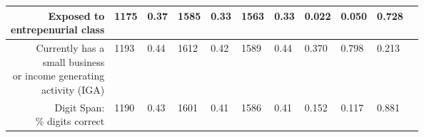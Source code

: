 \begin{longtable}{|r|l|l|l|l|l|l|l|l|l|l}
	 \makecell{Exposed to \\entrepenurial class}                                     & 1175                                                               &  0.37                                                              & 1585                                                               &  0.33                                                              & 1563                                                               &  0.33                                                              & 0.022                                                              & 0.050                                                              & 0.728                                                             \\

\hline

	 \makecell{Currently has a\\ small business\\ or income generating\\ activity (IGA)} & 1193                                                               &  0.44                                                              & 1612                                                               &  0.42                                                              & 1589                                                               &  0.44                                                              & 0.370                                                              & 0.798                                                              & 0.213                                                             \\

\hline

	 \makecell{Digit Span: \\\% digits correct}                                       & 1190                                                                 &  0.43                                                                & 1601                                                                 &  0.41                                                                & 1586                                                                 &  0.41                                                                & 0.152                                                                & 0.117                                                                & 0.881                                                               \\


\end{longtable}
